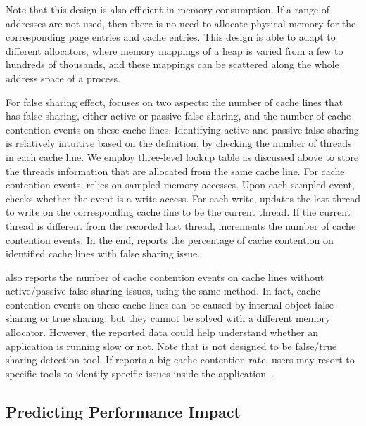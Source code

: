 Note that this design is also efficient in memory consumption. If a range of addresses are not used, then there is no need to allocate physical memory for the corresponding page entries and cache entries. This design is able to adapt to different allocators, where memory mappings of a heap is varied from a few to hundreds of thousands, and these mappings can be scattered along the whole address space of a process. 

For false sharing effect, \MP{} focuses on two aspects: the number of cache lines that has false sharing, either active or passive false sharing, and the number of cache contention events on these cache lines. Identifying active and passive false sharing is relatively intuitive based on the definition, by checking the number of threads in each cache line. We employ three-level lookup table as discussed above to store the threads information that are allocated from the same cache line. 
For cache contention events, \MP{} relies on sampled memory accesses. Upon each sampled event, \MP{} checks whether the event is a write access. For each write, \MP{} updates the last thread to write on the corresponding cache line to be the current thread. If the current thread is different from the recorded last thread, \MP{} increments the number of cache contention events. In the end, \MP{} reports the percentage of cache contention on identified cache lines with false sharing issue. 

\MP{} also reports the number of cache contention events on cache lines without active/passive false sharing issues, using the same method. In fact, cache contention events on these cache lines can be caused by internal-object false sharing or true sharing, but they cannot be solved with a different memory allocator. However, the reported data could help understand whether an application is running slow or not. Note that \MP{} is not designed to be false/true sharing detection tool. If \MP{} reports a big cache contention rate, users may resort to specific tools to identify specific issues inside the application~\cite{Sheriff, Predator, DBLP:conf/ppopp/ChabbiWL18}. 
   

\subsection{Predicting Performance Impact}
\label{sec:predict}

